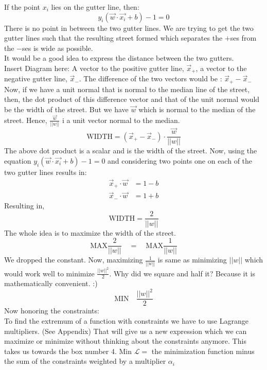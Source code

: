 \documentclass[12pt,a4paper]{report}
\begin{document}
If the point $x_i$ lies on the gutter line, then:
\begin{equation}
y_i(\vec{w} \cdot \vec{x_i} + b) - 1 = 0
\end{equation}
There is no point in between the two gutter lines. 
We are trying to get the two gutter lines such that the resulting street formed which separates the $+$ses from the $-$ses is wide as possible. \\
It would be a good idea to express the distance between the two gutters.\\

Insert Diagram here:
A vector to the positive gutter line, $\vec{x}_+$, a vector to the negative gutter line, $\vec{x}_-$. 
The difference of the two vectors would be : $\vec{x}_+ - \vec{x}_-$
Now, if we have a unit normal that is normal to the median line of the street, then, the dot product of this difference vector and that of the unit normal would be the width of the street. But we have $\vec{w}$ which is normal to the median of the street. Hence, $\frac{\vec{w}}{||w||}$ i a unit vector normal to the median.\\
\begin{equation}
\text{WIDTH} = (\vec{x}_+ - \vec{x}_-) \cdot \frac{\vec{w}}{||w||}
\end{equation}
The above dot product is a scalar and is the width of the street. Now, using the equation $y_i(\vec{w} \cdot \vec{x_i} + b) - 1 = 0$ and considering two points one on each of the two gutter lines results in:\\
\begin{align}
\vec{x}_+ \cdot \vec{w} &= 1 - b \\
\vec{x}_- \cdot \vec{w} &= 1 + b 
\end{align}
Resulting in,
\begin{equation}
\text{WIDTH} =  \frac{2}{||w||}
\end{equation}
The whole idea is to maximize the width of the street.
\begin{equation}
\text{MAX}  \frac{2}{||w||} \quad = \quad \text{MAX}  \frac{1}{||w||} 
\end{equation}
We dropped the constant. Now, maximizing $\frac{1}{||w||} $ is same as minimizing $||w||$ which would work well to minimize $\frac{||w||^2}{2} $. Why did we square and half it? Because it is mathematically convenient. :) \\
\begin{equation}
\boxed{
\text{MIN} \quad \frac{||w||^2}{2}
}
\end{equation}
Now honoring the constraints:\\
To find the extremum of a function with constraints we have to use Lagrange multipliers. (See Appendix) That will give us a new expression which we can maximize or minimize without thinking about the constraints anymore. This takes us towards the box number 4. Min $\mathcal{L} = $ the minimization function minus the sum of the constraints weighted by a multiplier $\alpha_i$
\end{document}
